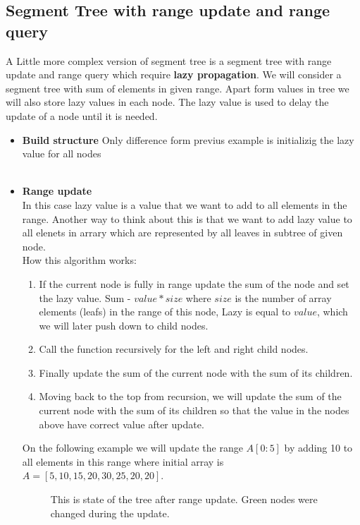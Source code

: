 \documentclass{article}
\begin{document}
\subsection{Segment Tree with range update and range query}
A Little more complex version of segment tree is a segment tree with range update and range query which require \textbf{lazy propagation}.
We will consider a segment tree with sum of elements in given range. 
Apart form values in tree we will also store lazy values in each node.
The lazy value is used to delay the update of a node until it is needed.
\begin{itemize}
    \item \textbf{Build structure} 
    Only difference form previus example is initializig the lazy value for all nodes \\
    \\


    \item \textbf{Range update} \\
    In this case lazy value is a value that we want to add to all elements in the range.
    Another way to think about this is that we want to add lazy value to all elenets in arrary 
    which are represented by all leaves in subtree of given node.
     \\
    How this algorithm works:
    \begin{enumerate}
        \item If the current node is fully in range update the sum of the node and set the lazy value. Sum - $value*size$ where $size$ is the number of array elements (leafs) in the range of this node, Lazy is equal to $value$, which we will later push down to child nodes.
        \item Call the function recursively for the left and right child nodes.
        \item Finally update the sum of the current node with the sum of its children.
        \item Moving back to the top from recursion, we will update the sum of the current node with the sum of its children so that the value in the nodes above have correct value after update.
    \end{enumerate}
On the following example we will update the range \(A[0:5]\) by adding 10 to all elements in this range
where initial array is \(A = [5, 10, 15, 20, 30, 25, 20, 20]\).
    
    \begin{figure}[H]
        \centering
        
        \caption{This is state of the tree after range update. Green nodes were changed during the update.}
        \label{fig:segment_tree_4}
    \end{figure}


\end{itemize}
\end{document}

